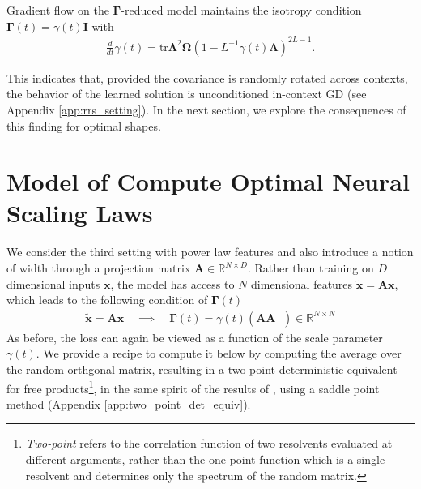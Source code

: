 \documentclass{article} %
\def\x{\bm x}
\begin{document}


\begin{tcolorbox}[colframe=myblue, opacityback=0.95, title=Result 6: Gradient Flow Generates Isotropic $\bm\Gamma$]  
    Gradient flow on the $\bm\Gamma$-reduced model maintains the isotropy condition $\bm\Gamma(t) = \gamma(t) \bm I$ with
    \begin{align}
        \frac{d}{dt} \gamma(t) = \text{tr} \bm\Lambda^2 \bm\Omega \left( 1 - L^{-1} \gamma(t) \bm\Lambda \right)^{2L-1} .
    \end{align}
\end{tcolorbox}
This indicates that, provided the covariance is randomly rotated across contexts, the behavior of the learned solution is unconditioned in-context GD (see Appendix \ref{app:rrs_setting}). In the next section, we explore the consequences of this finding for optimal shapes.

\vspace{-10pt}

\section{Model of Compute Optimal Neural Scaling Laws}
\vspace{-10pt}


We consider the third setting with power law features and also introduce a notion of width through a projection matrix $\bm A \in \mathbb{R}^{N \times D}$. Rather than training on $D$ dimensional inputs $\bm x$, the model has access to $N$ dimensional features $\tilde{\x} = \bm A \x$, which leads to the following condition of $\bm\Gamma(t)$
\begin{align}
    \tilde{\x}  = \bm A \x \quad  {\implies} \quad   \bm\Gamma(t) = \gamma(t) \left( \bm A \bm A^\top \right) \in \mathbb{R}^{N \times N}
\end{align}
As before, the loss can again be viewed as a function of the scale parameter $\gamma(t)$. We provide a recipe to compute it below by computing the average over the random orthgonal matrix, resulting in a two-point deterministic equivalent for free products\footnote{\textit{Two-point} refers to the correlation function of two resolvents evaluated at different arguments, rather than the one point function which is a single resolvent and determines only the spectrum of the random matrix.}, in the same spirit of the results of \citep{bordelon2024dynamical, atanasov2025two}, using a saddle point method (Appendix \ref{app:two_point_det_equiv}). 
\end{document}
